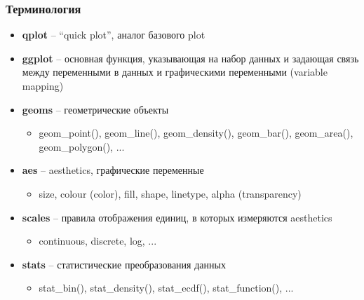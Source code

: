 \documentclass[compress]{beamer}\usepackage[]{graphicx}\usepackage[]{color}
\begin{document}
\begin{frame}[fragile]
\frametitle{Терминология}
\begin{itemize}
\item \textbf{qplot} -- ``quick plot'', аналог базового plot
\item \textbf{ggplot} -- основная функция, указывающая на набор данных 
  и задающая связь между переменными в данных и графическими переменными (variable mapping)
\item \textbf{geoms} -- геометрические объекты
    \begin{itemize}
    \item geom\_point(), geom\_line(), geom\_density(), geom\_bar(), geom\_area(), geom\_polygon(), ...
    \end{itemize}
\item \textbf{aes} --  aesthetics, графические переменные
    \begin{itemize}
    \item size, colour (color), fill, shape, linetype, alpha (transparency)
    \end{itemize}
\item \textbf{scales} -- правила отображения единиц, в которых измеряются aesthetics
    \begin{itemize}
    \item continuous, discrete, log, ...
    \end{itemize}
\item \textbf{stats} -- статистические преобразования данных
    \begin{itemize}
    \item stat\_bin(), stat\_density(), stat\_ecdf(), stat\_function(), ...
    \end{itemize}
\end{itemize}
\end{frame}
\end{document}
